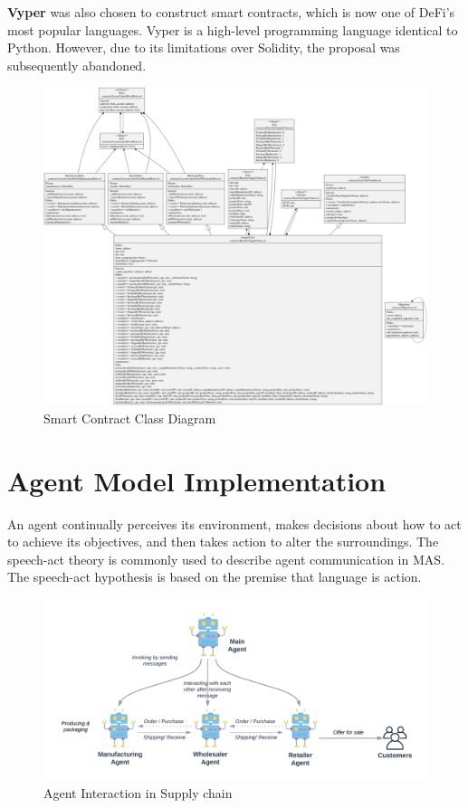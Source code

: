 \vspace{.5cm}

\textbf{Vyper} was also chosen to construct smart contracts, which is now one of \ac{DeFi}'s most popular languages. Vyper is a high-level programming language identical to Python. However, due to its limitations over Solidity, the proposal was subsequently abandoned.


\begin{figure}[!h]
\centering
  \includegraphics[width=21cm, angle=90]{includes/figures/OverallClassDiagram.png} 
  \caption{Smart Contract Class Diagram}
  \label{Overall Class Diagram}
\end{figure}


\section{Agent Model Implementation}

An agent continually perceives its environment, makes decisions about how to act to achieve its objectives, and then takes action to alter the surroundings. The speech-act theory is commonly used to describe agent communication in \ac{MAS}. The speech-act hypothesis is based on the premise that language is action.

\vspace{.5cm}

\begin{figure}[h]
    \centering
      \includegraphics[width=\linewidth]{includes/figures/agent.png} 
      \caption{Agent Interaction in Supply chain}
      \label{Agent Interaction}
    \end{figure}
  

